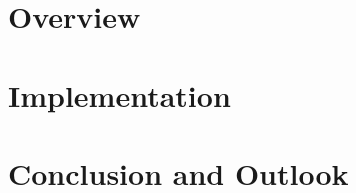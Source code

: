 \documentclass[tog]{acmsiggraph}
\begin{document}
\section{Overview}


\section{Implementation}


%

\section{Conclusion and Outlook} %










\end{document}

